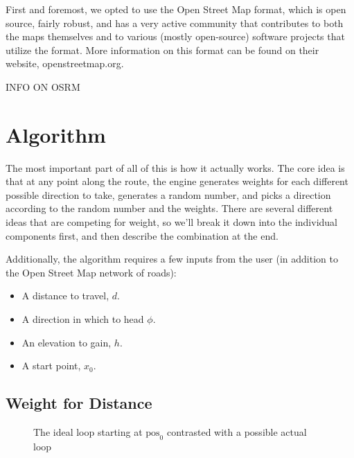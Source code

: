 \documentclass[twocolumn,11pt]{article}
\begin{document}
First and foremost, we opted to use the Open Street Map format, which is open
source, fairly robust, and has a very active community that contributes to both
the maps themselves and to various (mostly open-source) software projects that
utilize the format. More information on this format can be found on their
website, openstreetmap.org.

INFO ON OSRM

\section{Algorithm}

The most important part of all of this is how it actually works. The core idea
is that at any point along the route, the engine generates weights for each
different possible direction to take, generates a random number, and picks a
direction according to the random number and the weights. There are several
different ideas that are competing for weight, so we'll break it down into the
individual components first, and then describe the combination at the end.

Additionally, the algorithm requires a few inputs from the user (in addition
to the Open Street Map network of roads):
\begin{itemize}
\item A distance to travel, $d$.
\item A direction in which to head $\phi$.
\item An elevation to gain, $h$.
\item A start point, $x_0$.
\end{itemize}

\subsection{Weight for Distance}

\begin{figure}
  \centering
  \caption{The ideal loop starting at $\mbox{pos}_0$ contrasted with a possible
    actual loop} \label{fig:ideal}
\end{figure}
\end{document}
